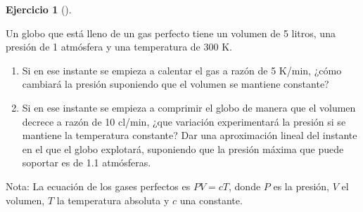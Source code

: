 \documentclass[
  a4paper,
]{scrreport}
\theoremstyle{definition}
\newtheorem{exercise}{Ejercicio}[chapter]
\theoremstyle{remark}
\begin{document}
\begin{exercise}[]\protect\hypertarget{exr-6}{}\label{exr-6}

Un globo que está lleno de un gas perfecto tiene un volumen de 5 litros,
una presión de 1 atmósfera y una temperatura de 300 K.

\begin{enumerate}
\def\labelenumi{\alph{enumi}.}
\item
  Si en ese instante se empieza a calentar el gas a razón de 5 K/min,
  ¿cómo cambiará la presión suponiendo que el volumen se mantiene
  constante?
\item
  Si en ese instante se empieza a comprimir el globo de manera que el
  volumen decrece a razón de 10 cl/min, ¿que variación experimentará la
  presión si se mantiene la temperatura constante? Dar una aproximación
  lineal del instante en el que el globo explotará, suponiendo que la
  presión máxima que puede soportar es de 1.1 atmósferas.
\end{enumerate}

Nota: La ecuación de los gases perfectos es \(PV = cT\), donde \(P\) es
la presión, \(V\) el volumen, \(T\) la temperatura absoluta y \(c\) una
constante.

\end{exercise}
\end{document}
